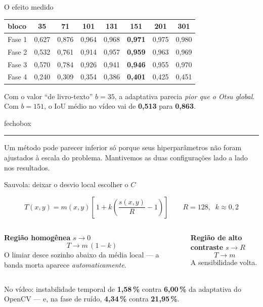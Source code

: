 \documentclass[aspectratio=169,12pt]{beamer}
\newcommand{\adapt}[1]{\textcolor{cAdapt}{\textbf{#1}}}
\newcommand{\num}[1]{\textcolor{brasa}{\textbf{#1}}}
\newenvironment{fecho}
  {\begin{beamercolorbox}[wd=\textwidth, sep=.75em, leftskip=.6em]{fechobox}%
   \hspace{-.6em}\textcolor{brasa}{\rule[-.35em]{2.5pt}{1.15em}}\hspace{.5em}\ignorespaces}
  {\end{beamercolorbox}}
\begin{document}
\begin{frame}{O efeito medido}

  \footnotesize
  \begin{center}
  \begin{tabular}{@{}lccccccc@{}}
    \toprule
    \textbf{bloco} & 35 & 71 & 101 & 131 & \textbf{151} & 201 & 301 \\
    \midrule
    Fase 1 & 0,627 & 0,876 & 0,964 & 0,968 & \textbf{0,971} & 0,975 & 0,980 \\
    Fase 2 & 0,532 & 0,761 & 0,914 & 0,957 & \textbf{0,959} & 0,963 & 0,969 \\
    Fase 3 & 0,570 & 0,784 & 0,926 & 0,941 & \textbf{0,946} & 0,955 & 0,970 \\
    Fase 4 & 0,240 & 0,309 & 0,354 & 0,386 & \textbf{0,401} & 0,425 & 0,451 \\
    \bottomrule
  \end{tabular}
  \end{center}

  \vspace{1em}
  \normalsize
  Com o valor ``de livro-texto'' $b=35$, a adaptativa parecia \emph{pior que o
  Otsu global}. Com $b=151$, o IoU médio no vídeo vai de
  \num{0,513} para \num{0,863}.

  \vspace{.8em}
  \begin{fecho}
    Um método pode parecer inferior só porque seus hiperparâmetros não foram
    ajustados à \alert{escala do problema}. Mantivemos as duas configurações
    lado a lado nos resultados.
  \end{fecho}

\end{frame}

\begin{frame}{Sauvola: deixar o desvio local escolher o $C$}

  \[
    T(x,y)=m(x,y)\left[\,1+k\left(\frac{s(x,y)}{R}-1\right)\right]
    \qquad R=128,\;\; k\approx0{,}2
  \]

  \vspace{.6em}
  \begin{columns}[T,onlytextwidth]
      \textbf{Região homogênea} $s\to0$
      \[ T \to m\,(1-k) \]
      O limiar desce sozinho abaixo da média local — a banda morta aparece
      \emph{automaticamente}.

      \textbf{Região de alto contraste} $s\to R$
      \[ T \to m \]
      A sensibilidade volta.
  \end{columns}

  \vspace{.8em}
  No vídeo: instabilidade temporal de \adapt{1,58\,\%} contra \num{6,00\,\%} da
  adaptativa do OpenCV — e, na fase de ruído, \adapt{4,34\,\%} contra
  \num{21,95\,\%}.

\end{frame}
\end{document}
